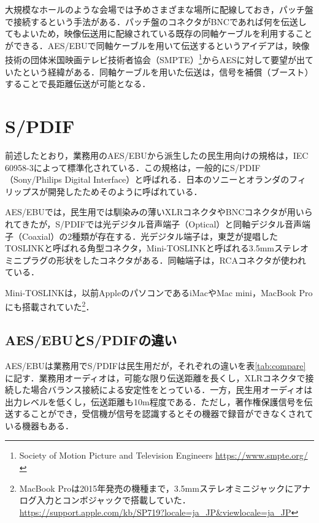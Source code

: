 大規模なホールのような会場では予めさまざまな場所に配線しておき，パッチ盤で接続するという手法がある．パッチ盤のコネクタがBNCであれば何を伝送してもよいため，映像伝送用に配線されている既存の同軸ケーブルを利用することができる．AES/EBUで同軸ケーブルを用いて伝送するというアイデアは，映像技術の団体米国映画テレビ技術者協会（SMPTE）\footnote{Society of Motion Picture and Television Engineers \url{https://www.smpte.org/}}からAESに対して要望が出ていたという経緯がある\cite{aes3id-1995-column}．同軸ケーブルを用いた伝送は，信号を補償（ブースト）することで長距離伝送が可能となる．

\section{S/PDIF}

前述したとおり，業務用のAES/EBUから派生したの民生用向けの規格は，IEC 60958-3によって標準化されている．この規格は，一般的にS/PDIF（Sony/Philips Digital Interface）と呼ばれる．日本のソニーとオランダのフィリップスが開発したためそのように呼ばれている．

AES/EBUでは，民生用では馴染みの薄いXLRコネクタやBNCコネクタが用いられてきたが，S/PDIFでは光デジタル音声端子（Optical）と同軸デジタル音声端子（Coaxial）の2種類が存在する．光デジタル端子は，東芝が提唱したTOSLINKと呼ばれる角型コネクタ，Mini-TOSLINKと呼ばれる3.5mmステレオミニプラグの形状をしたコネクタがある．同軸端子は，RCAコネクタが使われている．

Mini-TOSLINKは，以前AppleのパソコンであるiMacやMac mini，MacBook Proにも搭載されていた\footnote{MacBook Proは2015年発売の機種まで，3.5mmステレオミニジャックにアナログ入力とコンボジャックで搭載していた． \url{https://support.apple.com/kb/SP719?locale=ja_JP&viewlocale=ja_JP}}．

\subsection{AES/EBUとS/PDIFの違い}

AES/EBUは業務用でS/PDIFは民生用だが，それぞれの違いを表\ref{tab:compare}に記す．業務用オーディオは，可能な限り伝送距離を長くし，XLRコネクタで接続した場合バランス接続による安定性をとっている．一方，民生用オーディオは出力レベルを低くし，伝送距離も10m程度である．ただし，著作権保護信号を伝送することができ，受信機が信号を認識するとその機器で録音ができなくされている機器もある．

